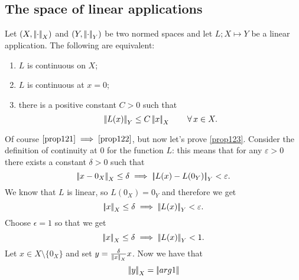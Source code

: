\documentclass{article}
\begin{document}
\subsection{The space of linear applications}
\begin{proposition}
	Let $(X,\left|\negthinspace\left|\cdot\right|\negthinspace\right|_X)$ and $(Y,\left|\negthinspace\left|\cdot\right|\negthinspace\right|_Y)$ be two normed spaces and let $L;X\mapsto Y$ be a linear application. The following are equivalent:
	\begin{enumerate}[\circnum]
		\item\label{prop121}$L$ is continuous on $X$;
		\item \label{prop122}$L$ is continuous at $x=0$;
		\item\label{prop123}there is a positive constant $C>0$ such that
		\[
		\left|\negthinspace\left|L(x)\right|\negthinspace\right|_Y\leq C\left|\negthinspace\left|x\right|\negthinspace\right|_X\qquad\forall\, x\in X.
		\]
	\end{enumerate}
\end{proposition} 
\begin{fancyproof}
	Of course $\ref{prop121}\implies\ref{prop122}$, but now let's prove \ref{prop123}. Consider the definition of continuity at 0 for the function $L$: this means that for any $\varepsilon>
	0$ there exists a constant $\delta>0$ such that
	\[
	\left|\negthinspace\left|x-0_X\right|\negthinspace\right|_X\leq\delta\implies\left|\negthinspace\left|L(x)-L(0_Y)\right|\negthinspace\right|_Y<\varepsilon.
	\]
	We know that $L$ is linear, so $L(0_X)=0_Y$ and therefore we get
	\begin{equation*}
		\left|\negthinspace\left|x\right|\negthinspace\right|_X\leq\delta\implies\left|\negthinspace\left|L(x)\right|\negthinspace\right|_Y<\varepsilon.
	\end{equation*}
	Choose $\epsilon=1$ so that we get 
	\begin{equation*}
		\left|\negthinspace\left|x\right|\negthinspace\right|_X\leq\delta\implies\left|\negthinspace\left|L(x)\right|\negthinspace\right|_Y<1.
	\end{equation*}
	Let $x\in X\setminus\{0_X\}$ and set $y=\frac{\delta}{\left|\negthinspace\left|x\right|\negthinspace\right|_X}x$. Now we have that
	\begin{equation*}
		\left|\negthinspace\left|y\right|\negthinspace\right|_X=\left|\negthinspace\left|arg1\right|\negthinspace\right|
	\end{equation*}
\end{fancyproof}
\end{document}
